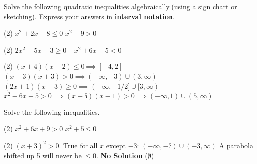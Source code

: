 \documentclass[12pt]{exam}
\begin{document}
\begin{questions}
\pagebreak

\question Solve the following quadratic inequalities algebraically (using a sign chart or sketching). Express your answers in \textbf{interval notation}.
\begin{tasks}(2)
    \task $x^2 + 2x - 8 \leq 0$
    \task $x^2 - 9 > 0$
    \end{tasks}
    \svert
    \begin{tasks}[resume](2)
    \task $2x^2 - 5x - 3 \geq 0$
    \task $-x^2 + 6x - 5 < 0$
\end{tasks}
\begin{solution}
\begin{tasks}(2)
    \task $(x+4)(x-2) \leq 0 \implies [-4, 2]$
    \task $(x-3)(x+3) > 0 \implies (-\infty, -3) \cup (3, \infty)$
    \task $(2x+1)(x-3) \geq 0 \implies (-\infty, -1/2] \cup [3, \infty)$
    \task $x^2 - 6x + 5 > 0 \implies (x-5)(x-1) > 0 \implies (-\infty, 1) \cup (5, \infty)$
\end{tasks}
\end{solution}
\svert


\question Solve the following inequalities.
\begin{tasks}(2)
    \task $x^2 + 6x + 9 > 0$
    \task $x^2 + 5 \leq 0$
\end{tasks}
\begin{solution}
\begin{tasks}(2)
    \task $(x+3)^2 > 0$. True for all $x$ except $-3$: $(-\infty, -3) \cup (-3, \infty)$
    \task A parabola shifted up 5 will never be $\leq 0$. \textbf{No Solution} ($\emptyset$)
\end{tasks}
\end{solution}
\svert
\end{questions}
\end{document}

